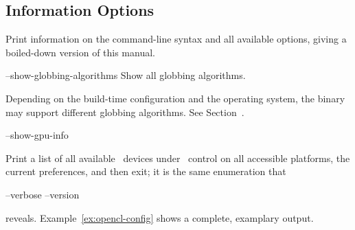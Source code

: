 

\subsection[Information Options\commonpart]{Information Options\commonpart
  \label{sec:information-options}
  }

\begin{codelist}
  \label{opt:help}%
\item[\itempar{-h \\ --help}]\itemend Print information on the
  command-line syntax and all available options, giving a
  boiled-down version of this manual.


  \label{opt:show-globbing-algorithms}%
\item[--show-globbing-algorithms]\itemend Show all globbing
  algorithms.%

  Depending on the build-time configuration and the operating system,
  the binary may support different globbing algorithms.  See
  Section~.


  \label{opt:show-gpu-info}%
\item[--show-gpu-info \restrictednote{\acronym{OpenCL}-enabled versions only.}]\itemend

  Print a list of all available ~devices under
  ~control on all
  accessible platforms, the current preferences, and then exit; it is
  the same enumeration that
  \begin{literal}
    \app{} --verbose --version
  \end{literal}
  reveals.%
  Example~\ref{ex:opencl-config} shows a complete, examplary output.


\end{codelist}
